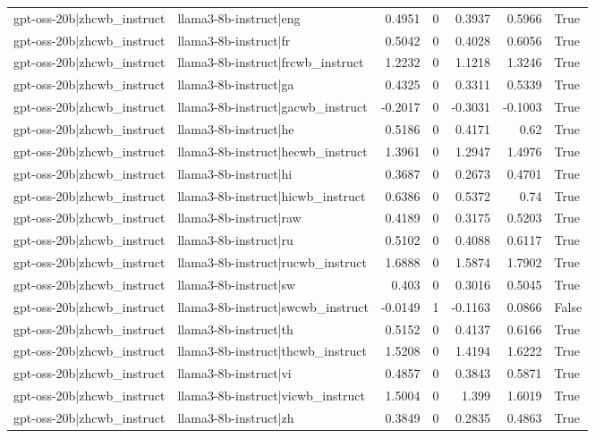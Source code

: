 \begin{table}
\begin{tabular}{l l r r r r l}
gpt-oss-20b|zhcwb_instruct & llama3-8b-instruct|eng & 0.4951 & 0 & 0.3937 & 0.5966 & True \\
gpt-oss-20b|zhcwb_instruct & llama3-8b-instruct|fr & 0.5042 & 0 & 0.4028 & 0.6056 & True \\
gpt-oss-20b|zhcwb_instruct & llama3-8b-instruct|frcwb_instruct & 1.2232 & 0 & 1.1218 & 1.3246 & True \\
gpt-oss-20b|zhcwb_instruct & llama3-8b-instruct|ga & 0.4325 & 0 & 0.3311 & 0.5339 & True \\
gpt-oss-20b|zhcwb_instruct & llama3-8b-instruct|gacwb_instruct & -0.2017 & 0 & -0.3031 & -0.1003 & True \\
gpt-oss-20b|zhcwb_instruct & llama3-8b-instruct|he & 0.5186 & 0 & 0.4171 & 0.62 & True \\
gpt-oss-20b|zhcwb_instruct & llama3-8b-instruct|hecwb_instruct & 1.3961 & 0 & 1.2947 & 1.4976 & True \\
gpt-oss-20b|zhcwb_instruct & llama3-8b-instruct|hi & 0.3687 & 0 & 0.2673 & 0.4701 & True \\
gpt-oss-20b|zhcwb_instruct & llama3-8b-instruct|hicwb_instruct & 0.6386 & 0 & 0.5372 & 0.74 & True \\
gpt-oss-20b|zhcwb_instruct & llama3-8b-instruct|raw & 0.4189 & 0 & 0.3175 & 0.5203 & True \\
gpt-oss-20b|zhcwb_instruct & llama3-8b-instruct|ru & 0.5102 & 0 & 0.4088 & 0.6117 & True \\
gpt-oss-20b|zhcwb_instruct & llama3-8b-instruct|rucwb_instruct & 1.6888 & 0 & 1.5874 & 1.7902 & True \\
gpt-oss-20b|zhcwb_instruct & llama3-8b-instruct|sw & 0.403 & 0 & 0.3016 & 0.5045 & True \\
gpt-oss-20b|zhcwb_instruct & llama3-8b-instruct|swcwb_instruct & -0.0149 & 1 & -0.1163 & 0.0866 & False \\
gpt-oss-20b|zhcwb_instruct & llama3-8b-instruct|th & 0.5152 & 0 & 0.4137 & 0.6166 & True \\
gpt-oss-20b|zhcwb_instruct & llama3-8b-instruct|thcwb_instruct & 1.5208 & 0 & 1.4194 & 1.6222 & True \\
gpt-oss-20b|zhcwb_instruct & llama3-8b-instruct|vi & 0.4857 & 0 & 0.3843 & 0.5871 & True \\
gpt-oss-20b|zhcwb_instruct & llama3-8b-instruct|vicwb_instruct & 1.5004 & 0 & 1.399 & 1.6019 & True \\
gpt-oss-20b|zhcwb_instruct & llama3-8b-instruct|zh & 0.3849 & 0 & 0.2835 & 0.4863 & True \\

\end{tabular}
\end{table}
